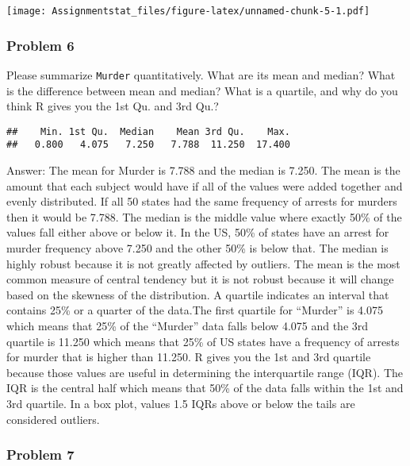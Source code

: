 \documentclass[
]{article}
\newenvironment{Shaded}{\begin{snugshade}}{\end{snugshade}}
\newcommand{\FunctionTok}[1]{\textcolor[rgb]{0.00,0.00,0.00}{#1}}
\newcommand{\NormalTok}[1]{#1}
\newcommand{\SpecialCharTok}[1]{\textcolor[rgb]{0.00,0.00,0.00}{#1}}
\begin{document}
\texttt{[image: Assignmentstat\_files/figure-latex/unnamed-chunk-5-1.pdf]}

\hypertarget{problem-6}{%
\subsubsection{Problem 6}\label{problem-6}}

Please summarize \texttt{Murder} quantitatively. What are its mean and
median? What is the difference between mean and median? What is a
quartile, and why do you think R gives you the 1st Qu. and 3rd Qu.?

\begin{Shaded}
\end{Shaded}

\begin{verbatim}
##    Min. 1st Qu.  Median    Mean 3rd Qu.    Max. 
##   0.800   4.075   7.250   7.788  11.250  17.400
\end{verbatim}

Answer: The mean for Murder is 7.788 and the median is 7.250. The mean
is the amount that each subject would have if all of the values were
added together and evenly distributed. If all 50 states had the same
frequency of arrests for murders then it would be 7.788. The median is
the middle value where exactly 50\% of the values fall either above or
below it. In the US, 50\% of states have an arrest for murder frequency
above 7.250 and the other 50\% is below that. The median is highly
robust because it is not greatly affected by outliers. The mean is the
most common measure of central tendency but it is not robust because it
will change based on the skewness of the distribution. A quartile
indicates an interval that contains 25\% or a quarter of the data.The
first quartile for ``Murder'' is 4.075 which means that 25\% of the
``Murder'' data falls below 4.075 and the 3rd quartile is 11.250 which
means that 25\% of US states have a frequency of arrests for murder that
is higher than 11.250. R gives you the 1st and 3rd quartile because
those values are useful in determining the interquartile range (IQR).
The IQR is the central half which means that 50\% of the data falls
within the 1st and 3rd quartile. In a box plot, values 1.5 IQRs above or
below the tails are considered outliers.

\hypertarget{problem-7}{%
\subsubsection{Problem 7}\label{problem-7}}
\end{document}
